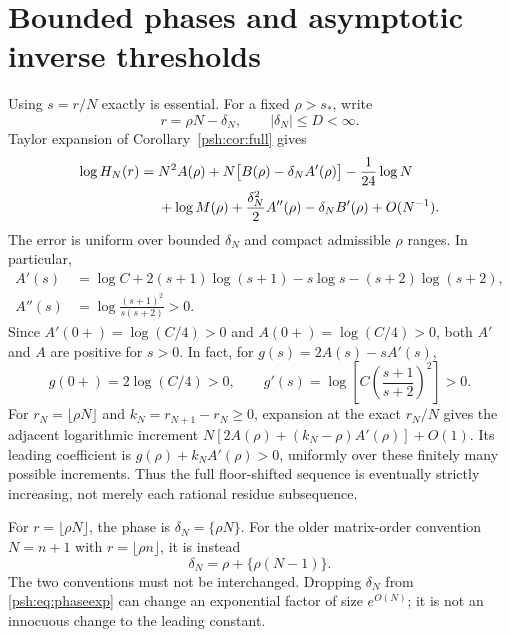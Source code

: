 \documentclass[11pt,a4paper]{article}
\numberwithin{equation}{section}
\theoremstyle{remark}\newtheorem{remark}[theorem]{Remark}
\begin{document}
\section{Bounded phases and asymptotic inverse thresholds}\label{psh:sec:inverse}
Using $s=r/N$ exactly is essential. For a fixed $\rho>s_*$, write
\begin{equation}\label{psh:eq:phase}
 r=\rho N-\delta_N,\qquad |\delta_N|\leq D<\infty.
\end{equation}
Taylor expansion of Corollary~\ref{psh:cor:full} gives
\begin{align}
 \log H_N(r)={}&N^2A(\rho)
   +N\bigl[B(\rho)-\delta_N A'(\rho)\bigr]-\frac1{24}\log N\notag\\
 &+\log M(\rho)+\frac{\delta_N^2}{2}A''(\rho)
                       -\delta_N B'(\rho)+O(N^{-1}).\label{psh:eq:phaseexp}
\end{align}
The error is uniform over bounded $\delta_N$ and compact admissible
$\rho$ ranges. In particular,
\begin{align}
 A'(s)&=\log C+2(s+1)\log(s+1)-s\log s-(s+2)\log(s+2),\label{psh:eq:Aprime}\\
 A''(s)&=\log\frac{(s+1)^2}{s(s+2)}>0.\label{psh:eq:Adouble}
\end{align}
Since $A'(0+)=\log(C/4)>0$ and $A(0+)=\log(C/4)>0$, both $A'$ and $A$
are positive for $s>0$.
In fact, for $g(s)=2A(s)-sA'(s)$,
\[
 g(0+)=2\log(C/4)>0,\qquad
 g'(s)=\log\left[C\left(\frac{s+1}{s+2}\right)^2\right]>0.
\]
For $r_N=\lfloor\rho N\rfloor$ and $k_N=r_{N+1}-r_N\geq0$,
expansion at the exact $r_N/N$ gives the adjacent logarithmic increment
$N[2A(\rho)+(k_N-\rho)A'(\rho)]+O(1)$.
Its leading coefficient is $g(\rho)+k_NA'(\rho)>0$, uniformly over
these finitely many possible increments. Thus the full floor-shifted
sequence is eventually strictly increasing, not merely each rational
residue subsequence.

For $r=\lfloor\rho N\rfloor$, the phase is $\delta_N=\{\rho N\}$.
For the older matrix-order convention $N=n+1$ with
$r=\lfloor\rho n\rfloor$, it is instead
\begin{equation}\label{psh:eq:olderphase}
 \delta_N=\rho+\{\rho(N-1)\}.
\end{equation}
The two conventions must not be interchanged. Dropping $\delta_N$ from
\eqref{psh:eq:phaseexp} can change an exponential factor of size $e^{O(N)}$;
it is not an innocuous change to the leading constant.
\end{document}
